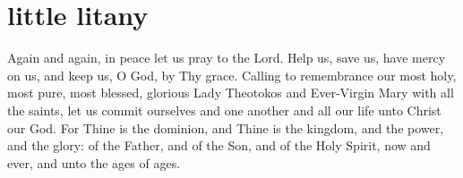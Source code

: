\section{little litany}

\begin{liturgicaltext}
    \deacon Again and again, in peace let us pray to the Lord.
    \choir {}
    \deacon Help us, save us, have mercy on us, and keep us, O God, by Thy grace.
    \choir {}
    \deacon Calling to remembrance our most holy, most pure, most blessed, glorious Lady Theotokos and Ever-Virgin Mary with all the saints, let us commit ourselves and one another and all our life unto Christ our God.
    \choir {} \pagebreak
    \priest For Thine is the dominion, and Thine is the kingdom, and the power, and the glory: of the Father, and of the Son, and of the Holy Spirit, now and ever, and unto the ages of ages.
    \choir {}
\end{liturgicaltext}



